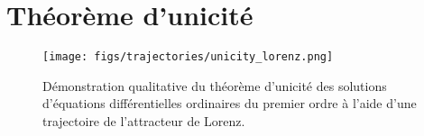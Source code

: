 \section{Théorème d'unicité} \label{sec: annexe_uniqueness}
    \begin{figure}[h!]
        \centering
        \texttt{[image: figs/trajectories/unicity\_lorenz.png]}
        \caption{Démonstration qualitative du théorème d'unicité des solutions
        d'équations différentielles ordinaires du premier ordre à l'aide d'une
    trajectoire de l'attracteur de Lorenz.}
        \label{fig: lorenz_uniqueness}
    \end{figure}
